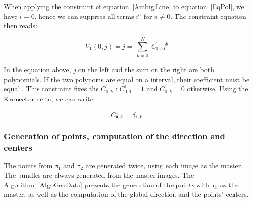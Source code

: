 \documentclass{ipol}
\begin{document}
{When applying the constraint of equation~\eqref{Ambig:Line} to equation~\eqref{EqPol}, 
we have $i=0$, hence we can suppress all terms  $i^a$ for $a\neq 0$}. The constraint equation then reads:

\begin{equation}
    V_1(0,j) =  j =   \sum\limits_{\substack{b=0}}^{N}  C^1_{0,b}  j^b  \label{CstrV1:0}
\end{equation}

In the equation above, $j$ on the left and the  sum on the right are both polynomials. If the two polynoms are equal on a interval, their coefficient must be equal . This constraint fixes the $C^1_{0,k}$ : $C^1_{0,1}=1$ and $C^1_{0,k}=0$ otherwise.
Using the Kronecker delta, we can write:

\begin{equation}
         C^1_{0,k} = \delta_{1,k} \label{CstrV1:1}
\end{equation}

\subsubsection{Generation of points, computation of the direction and centers}

The  points from $\pi_1$ and $\pi_2$ are generated twice, using each image as the master. The bundles are always generated from the  master images. The Algorithm~\ref{AlgoGenData} presents the 
generation of the points with $I_1$  as the master, as well as the computation of the global direction and the points' centers.
\end{document}
